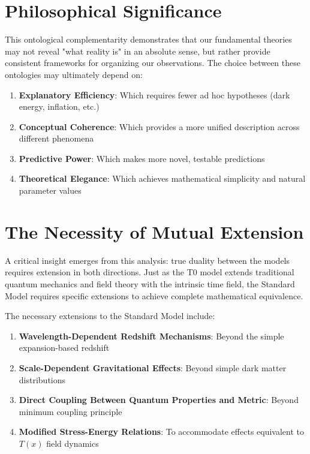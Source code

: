 \documentclass[12pt,a4paper]{article}
\newcommand{\Tfield}{T(x)}
\begin{document}
	\section{Philosophical Significance}
	
	This ontological complementarity demonstrates that our fundamental theories may not reveal "what reality is" in an absolute sense, but rather provide consistent frameworks for organizing our observations. The choice between these ontologies may ultimately depend on:
	
	\begin{enumerate}
		\item \textbf{Explanatory Efficiency}: Which requires fewer ad hoc hypotheses (dark energy, inflation, etc.)
		\item \textbf{Conceptual Coherence}: Which provides a more unified description across different phenomena
		\item \textbf{Predictive Power}: Which makes more novel, testable predictions
		\item \textbf{Theoretical Elegance}: Which achieves mathematical simplicity and natural parameter values
	\end{enumerate}
	
	\section{The Necessity of Mutual Extension}
	
	A critical insight emerges from this analysis: true duality between the models requires extension in both directions. Just as the T0 model extends traditional quantum mechanics and field theory with the intrinsic time field, the Standard Model requires specific extensions to achieve complete mathematical equivalence.
	
	The necessary extensions to the Standard Model include:
	
	\begin{enumerate}
		\item \textbf{Wavelength-Dependent Redshift Mechanisms}: Beyond the simple expansion-based redshift
		\item \textbf{Scale-Dependent Gravitational Effects}: Beyond simple dark matter distributions
		\item \textbf{Direct Coupling Between Quantum Properties and Metric}: Beyond minimum coupling principle
		\item \textbf{Modified Stress-Energy Relations}: To accommodate effects equivalent to $\Tfield$ field dynamics
	\end{enumerate}
	
\end{document}
